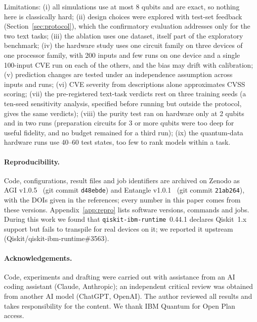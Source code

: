 \documentclass[11pt]{article}
\begin{document}
Limitations: (i) all simulations use at most 8 qubits and are exact, so nothing here is classically hard; (ii) design choices were explored with test-set feedback (Section~\ref{sec:protocol}), which the confirmatory evaluation addresses only for the two text tasks; (iii) the ablation uses one dataset, itself part of the exploratory benchmark; (iv) the hardware study uses one circuit family on three devices of one processor family, with 200 inputs and few runs on one device and a single 100-input CVE run on each of the others, and the bias may drift with calibration; (v) prediction changes are tested under an independence assumption across inputs and runs; (vi) CVE severity from descriptions alone approximates CVSS scoring; (vii) the pre-registered text-task verdicts rest on three training seeds (a ten-seed sensitivity analysis, specified before running but outside the protocol, gives the same verdicts); (viii) the purity test ran on hardware only at 2 qubits and in two runs (preparation circuits for 3 or more qubits were too deep for useful fidelity, and no budget remained for a third run); (ix) the quantum-data hardware runs use 40--60 test states, too few to rank models within a task.

\paragraph{Reproducibility.} Code, configurations, result files and job identifiers are archived on Zenodo as AGI v1.0.5~\cite{reddy2026agi} (git commit \texttt{d48ebde}) and Entangle v1.0.1~\cite{reddy2026entangle} (git commit \texttt{21ab264}), with the DOIs given in the references; every number in this paper comes from these versions. Appendix~\ref{app:repro} lists software versions, commands and jobs. During this work we found that \texttt{qiskit-ibm-runtime}~0.44.1 declares Qiskit~1.x support but fails to transpile for real devices on it; we reported it upstream (Qiskit/qiskit-ibm-runtime\#3563).

\paragraph{Acknowledgements.} Code, experiments and drafting were carried out with assistance from an AI coding assistant (Claude, Anthropic); an independent critical review was obtained from another AI model (ChatGPT, OpenAI). The author reviewed all results and takes responsibility for the content. We thank IBM Quantum for Open Plan access.
\end{document}
